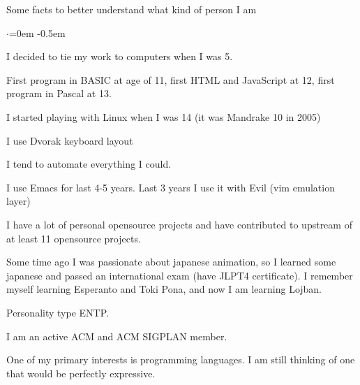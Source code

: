 \documentclass{resume} %
\begin{document}

\begin{rSection}{Some facts to better understand what kind of person I am}
  \smallskip
  \begin{list}{$\cdot$}{\leftmargin=0em} %
    \itemsep -0.5em \vspace{-0.5em} %
  \item I decided to tie my work to computers when I was 5.
  \item First program in BASIC at age of 11, first HTML and JavaScript at 12, first program in Pascal at 13.
  \item I started playing with Linux when I was 14 (it was Mandrake 10 in 2005)
  \item I use Dvorak keyboard layout
  \item I tend to automate everything I could.
  \item I use Emacs for last 4-5 years. Last 3 years I use it with Evil (vim emulation layer)
  \item I have a lot of personal opensource projects and have contributed to
        upstream of at least 11 opensource projects.
  \item Some time ago I was passionate about japanese animation, so I learned
        some japanese and passed an international exam (have JLPT4 certificate). I remember myself
        learning Esperanto and Toki Pona, and now I am learning Lojban.
  \item Personality type ENTP.
  \item I am an active ACM and ACM SIGPLAN member.
  \item One of my primary interests is programming languages. I am still thinking of one
        that would be perfectly expressive.
  \end{list}
\end{rSection}

\end{document}
